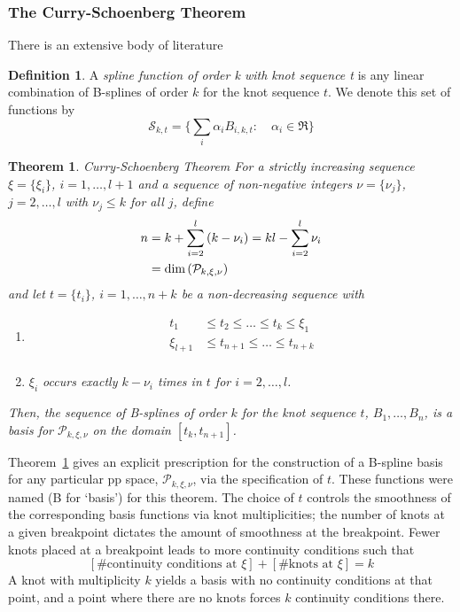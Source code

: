 \documentclass[12pt]{article}
\newcommand{\PP}{\mathcal{P}}
\newtheorem{theorem}{Theorem}[section]
\theoremstyle{definition}
\newtheorem{definition}{Definition}[section]
\begin{document}
\subsubsection{The Curry-Schoenberg Theorem}

There is an extensive body of literature 
\begin{definition}
A \emph{spline function of order k with knot sequence t} is any linear combination of B-splines of order $k$ for the knot sequence $t$. We denote this set of functions by 
\[
\mathscr{S}_{k,t} = \bigg\{ \sum_i \alpha_i B_{i,k,t}: \quad \alpha_i \in \Re \bigg \}
\]
\end{definition}

\begin{theorem}{Curry-Schoenberg Theorem} \label{curryschoenbergthm}
For a strictly increasing sequence $\xi = \big\{ \xi_i \big\}$, $i=1,\dots, l+1$ and a sequence of non-negative integers $\nu = \big\{ \nu_j \big\}$, $j=2, \dots,l$ with $\nu_j \le k$ for all $j$, define
\begin{align*}
n &= k + \sum_{i=2}^l\left(k-\nu_i\right) = kl - \sum_{i=2}^l \nu_i \\
&= \textup{dim}\left(\PP_{k,\xi,\nu}\right)
\end{align*}
and let 
$t = \big\{ t_i \big\}$, $i=1, \dots,n+k$ be a non-decreasing sequence with 
\begin{enumerate}
\item \begin{align*}
 t_1 & \le t_2 \le  \dots \le t_{k} \le \xi_1\\
 \xi_{l+1} & \le t_{n+1} \le  \dots \le t_{n+k}\\
\end{align*}
\item $\xi_i$ occurs exactly $k-\nu_i$ times in $t$ for $i=2,\dots,l$.
\end{enumerate}
Then, the sequence of B-splines of order $k$ for the knot sequence $t$, $B_1,\dots, B_n$, is a basis for $\PP_{k,\xi,\nu}$ on the domain $\left[t_k,t_{n+1} \right]$. 
\end{theorem}

Theorem~\ref{curryschoenbergthm} gives an explicit prescription for the construction of a B-spline basis for any particular pp space, $\PP_{k,\xi,\nu}$, via the specification of $t$. These functions were named (B for `basis') for this theorem. The choice of $t$ controls the smoothness of the corresponding basis functions via knot multiplicities; the number of knots at a given breakpoint dictates the amount of smoothness at the breakpoint. Fewer knots placed at a breakpoint leads to more continuity conditions such that 
\[
\left[\mbox{\# continuity conditions at } \xi\right] + \left[\mbox{\# knots at } \xi\right] = k
\]
A knot with multiplicity $k$ yields a basis with no continuity conditions at that point, and a point where there are no knots forces $k$ continuity conditions there.
\end{document}
